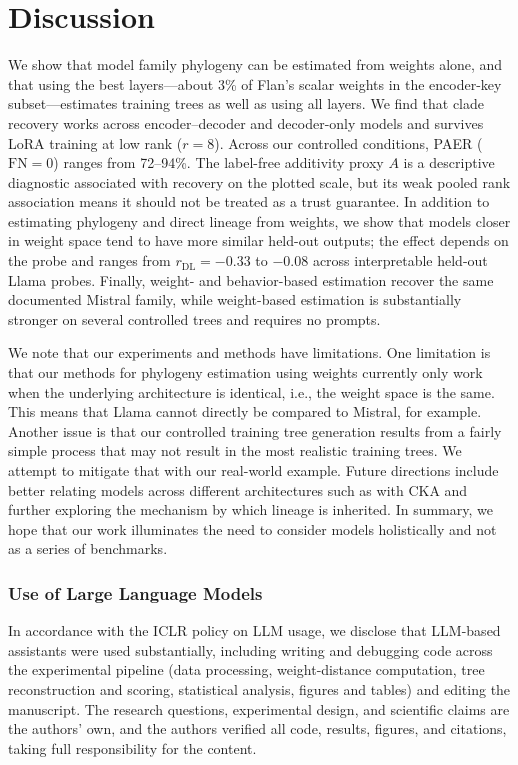 \documentclass{article}
\theoremstyle{definition}
\theoremstyle{plain}
\begin{document}
\section{Discussion}
\label{sec:discussion}

We show that model family phylogeny can be estimated from weights alone, and that using the best layers---about 3\% of Flan's scalar weights in the encoder-key subset---estimates training trees as well as using all layers.  We find that clade recovery works across encoder--decoder and decoder-only models and survives LoRA training at low rank ($r=8$). Across our controlled conditions, PAER ($\mathrm{FN}=0$) ranges from 72--94\%. The label-free additivity proxy $A$ is a descriptive diagnostic associated with recovery on the plotted scale, but its weak pooled rank association means it should not be treated as a trust guarantee. In addition to estimating phylogeny and direct lineage from weights, we show that models closer in weight space tend to have more similar held-out outputs; the effect depends on the probe and ranges from $r_{\mathrm{DL}}=-0.33$ to $-0.08$ across interpretable held-out Llama probes. Finally, weight- and behavior-based estimation recover the same documented Mistral family, while weight-based estimation is substantially stronger on several controlled trees and requires no prompts.


We note that our experiments and methods have limitations.  One limitation is that our methods for phylogeny estimation using weights currently only work when the underlying architecture is identical, i.e., the weight space is the same.  This means that Llama cannot directly be compared to Mistral, for example. Another issue is that our controlled training tree generation results from a fairly simple process that may not result in the most realistic training trees.  We attempt to mitigate that with our real-world example. Future directions include better relating models across different architectures such as with CKA and further exploring the mechanism by which lineage is inherited. In summary, we hope that our work illuminates the need to consider models holistically and not as a series of benchmarks.



\subsubsection*{Use of Large Language Models}
In accordance with the ICLR policy on LLM usage, we disclose that LLM-based assistants were used
substantially, including writing and debugging code across the experimental pipeline (data processing,
weight-distance computation, tree reconstruction and scoring, statistical analysis, figures and tables)
and editing the manuscript. The research questions, experimental design, and scientific claims are the
authors' own, and the authors verified all code, results, figures, and citations, taking full
responsibility for the content.
\end{document}
